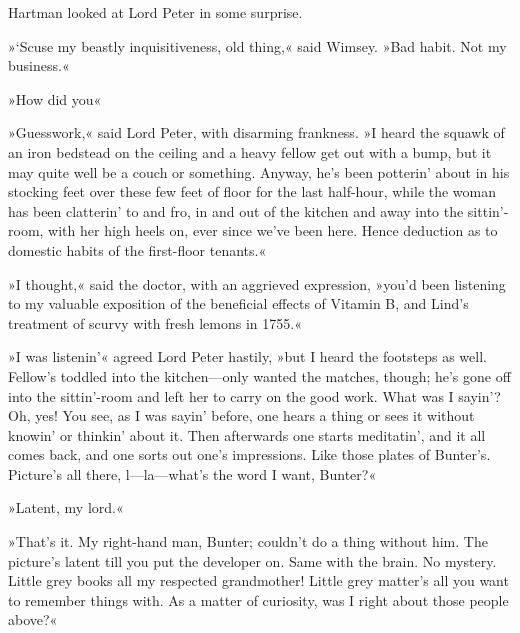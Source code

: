 Hartman looked at Lord Peter in some surprise.

»`Scuse my beastly inquisitiveness, old thing,« said Wimsey. »Bad habit. Not my business.«

»How did you\longdash«

»Guesswork,« said Lord Peter, with disarming frankness. »I heard the squawk of an iron bedstead on the ceiling and a heavy fellow get out with a bump, but it may quite well be a couch or something. Anyway, he's been potterin' about in his stocking feet over these few feet of floor for the last half-hour, while the woman has been clatterin' to and fro, in and out of the kitchen and away into the sittin'-room, with her high heels on, ever since we've been here. Hence deduction as to domestic habits of the first-floor tenants.«

»I thought,« said the doctor, with an aggrieved expression, »you'd been listening to my valuable exposition of the beneficial effects of Vitamin B, and Lind's treatment of scurvy with fresh lemons in 1755.«

»I was listenin'« agreed Lord Peter hastily, »but I heard the footsteps as well. Fellow's toddled into the kitchen—only wanted the matches, though; he's gone off into the sittin'-room and left her to carry on the good work. What was I sayin'? Oh, yes! You see, as I was sayin' before, one hears a thing or sees it without knowin' or thinkin' about it. Then afterwards one starts meditatin', and it all comes back, and one sorts out one's impressions. Like those plates of Bunter's. Picture's all there, l—la—what's the word I want, Bunter?«

»Latent, my lord.«

»That's it. My right-hand man, Bunter; couldn't do a thing without him. The picture's latent till you put the developer on. Same with the brain. No mystery. Little grey books all my respected grandmother! Little grey matter's all you want to remember things with. As a matter of curiosity, was I right about those people above?«

